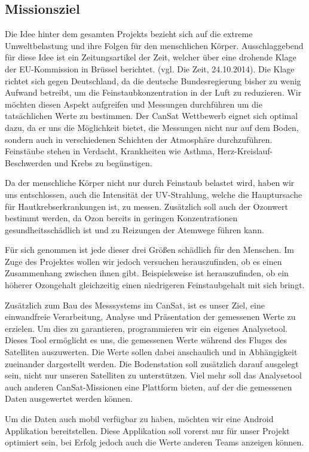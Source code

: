 \subsection{Missionsziel}
Die Idee hinter dem gesamten Projekts bezieht sich auf die extreme Umweltbelastung und ihre Folgen für den menschlichen Körper. Ausschlaggebend für diese Idee ist ein Zeitungsartikel der Zeit, welcher über eine drohende Klage der EU-Kommission in Brüssel berichtet. (vgl. Die Zeit, 24.10.2014). Die Klage richtet sich gegen Deutschland, da die deutsche Bundesregierung bisher zu wenig Aufwand betreibt, um die Feinstaubkonzentration in der Luft zu reduzieren. Wir möchten diesen Aspekt aufgreifen und Messungen durchführen um die tatsächlichen Werte zu bestimmen. Der CanSat Wettbewerb eignet sich optimal dazu, da er uns die Möglichkeit bietet, die Messungen nicht nur auf dem Boden, sondern auch in verschiedenen Schichten der Atmosphäre durchzuführen. Feinstäube stehen in Verdacht, Krankheiten wie Asthma, Herz-Kreislauf-Beschwerden und Krebs zu begünstigen.

Da der menschliche Körper nicht nur durch Feinstaub belastet wird, haben wir uns entschlossen, auch die Intensität der UV-Strahlung, welche die Hauptursache für Hautkrebserkrankungen ist, zu messen. Zusätzlich soll auch der Ozonwert bestimmt werden, da Ozon bereits in geringen Konzentrationen gesundheitsschädlich ist und zu Reizungen der Atemwege führen kann.

Für sich genommen ist jede dieser drei Größen schädlich für den Menschen. Im Zuge des Projektes wollen wir jedoch versuchen herauszufinden, ob es einen Zusammenhang zwischen ihnen gibt. Beispielsweise ist herauszufinden, ob ein höherer Ozongehalt gleichzeitig einen niedrigeren Feinstaubgehalt mit sich bringt.

Zusätzlich zum Bau des Messsystems im CanSat, ist es unser Ziel, eine einwandfreie Verarbeitung, Analyse und Präsentation der gemessenen Werte zu erzielen. Um dies zu garantieren, programmieren wir ein eigenes Analysetool. Dieses Tool ermöglicht es uns, die gemessenen Werte während des Fluges des Satelliten auszuwerten. Die Werte sollen dabei anschaulich und in Abhängigkeit zueinander dargestellt werden. Die Bodenstation soll zusätzlich darauf ausgelegt sein, nicht nur unseren Satelliten zu unterstützen. Viel mehr soll das Analysetool auch anderen CanSat-Missionen eine Plattform bieten, auf der die gemessenen Daten ausgewertet werden können.

Um die Daten auch mobil verfügbar zu haben, möchten wir eine Android Applikation bereitstellen. Diese Applikation soll vorerst nur für unser Projekt optimiert sein, bei Erfolg jedoch auch die Werte anderen Teams anzeigen können.

